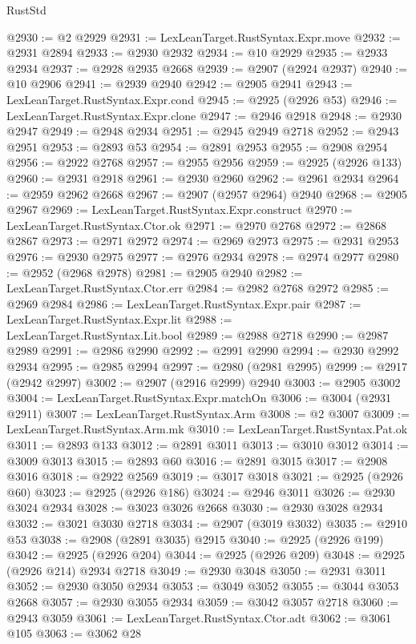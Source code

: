 \begin{lexlean}{RustStd}
\begin{coremodule}
@2930 := @2 @2929
@2931 := LexLeanTarget.RustSyntax.Expr.move
@2932 := @2931 @2894
@2933 := @2930 @2932
@2934 := @10 @2929
@2935 := @2933 @2934
@2937 := @2928 @2935 @2668
@2939 := @2907 (@2924 @2937)
@2940 := @10 @2906
@2941 := @2939 @2940
@2942 := @2905 @2941
@2943 := LexLeanTarget.RustSyntax.Expr.cond
@2945 := @2925 (@2926 @53)
@2946 := LexLeanTarget.RustSyntax.Expr.clone
@2947 := @2946 @2918
@2948 := @2930 @2947
@2949 := @2948 @2934
@2951 := @2945 @2949 @2718
@2952 := @2943 @2951
@2953 := @2893 @53
@2954 := @2891 @2953
@2955 := @2908 @2954
@2956 := @2922 @2768
@2957 := @2955 @2956
@2959 := @2925 (@2926 @133)
@2960 := @2931 @2918
@2961 := @2930 @2960
@2962 := @2961 @2934
@2964 := @2959 @2962 @2668
@2967 := @2907 (@2957 @2964) @2940
@2968 := @2905 @2967
@2969 := LexLeanTarget.RustSyntax.Expr.construct
@2970 := LexLeanTarget.RustSyntax.Ctor.ok
@2971 := @2970 @2768
@2972 := @2868 @2867
@2973 := @2971 @2972
@2974 := @2969 @2973
@2975 := @2931 @2953
@2976 := @2930 @2975
@2977 := @2976 @2934
@2978 := @2974 @2977
@2980 := @2952 (@2968 @2978)
@2981 := @2905 @2940
@2982 := LexLeanTarget.RustSyntax.Ctor.err
@2984 := @2982 @2768 @2972
@2985 := @2969 @2984
@2986 := LexLeanTarget.RustSyntax.Expr.pair
@2987 := LexLeanTarget.RustSyntax.Expr.lit
@2988 := LexLeanTarget.RustSyntax.Lit.bool
@2989 := @2988 @2718
@2990 := @2987 @2989
@2991 := @2986 @2990
@2992 := @2991 @2990
@2994 := @2930 @2992 @2934
@2995 := @2985 @2994
@2997 := @2980 (@2981 @2995)
@2999 := @2917 (@2942 @2997)
@3002 := @2907 (@2916 @2999) @2940
@3003 := @2905 @3002
@3004 := LexLeanTarget.RustSyntax.Expr.matchOn
@3006 := @3004 (@2931 @2911)
@3007 := LexLeanTarget.RustSyntax.Arm
@3008 := @2 @3007
@3009 := LexLeanTarget.RustSyntax.Arm.mk
@3010 := LexLeanTarget.RustSyntax.Pat.ok
@3011 := @2893 @133
@3012 := @2891 @3011
@3013 := @3010 @3012
@3014 := @3009 @3013
@3015 := @2893 @60
@3016 := @2891 @3015
@3017 := @2908 @3016
@3018 := @2922 @2569
@3019 := @3017 @3018
@3021 := @2925 (@2926 @60)
@3023 := @2925 (@2926 @186)
@3024 := @2946 @3011
@3026 := @2930 @3024 @2934
@3028 := @3023 @3026 @2668
@3030 := @2930 @3028 @2934
@3032 := @3021 @3030 @2718
@3034 := @2907 (@3019 @3032)
@3035 := @2910 @53
@3038 := @2908 (@2891 @3035) @2915
@3040 := @2925 (@2926 @199)
@3042 := @2925 (@2926 @204)
@3044 := @2925 (@2926 @209)
@3048 := @2925 (@2926 @214) @2934 @2718
@3049 := @2930 @3048
@3050 := @2931 @3011
@3052 := @2930 @3050 @2934
@3053 := @3049 @3052
@3055 := @3044 @3053 @2668
@3057 := @2930 @3055 @2934
@3059 := @3042 @3057 @2718
@3060 := @2943 @3059
@3061 := LexLeanTarget.RustSyntax.Ctor.adt
@3062 := @3061 @105
@3063 := @3062 @28

\end{coremodule}
\end{lexlean}
